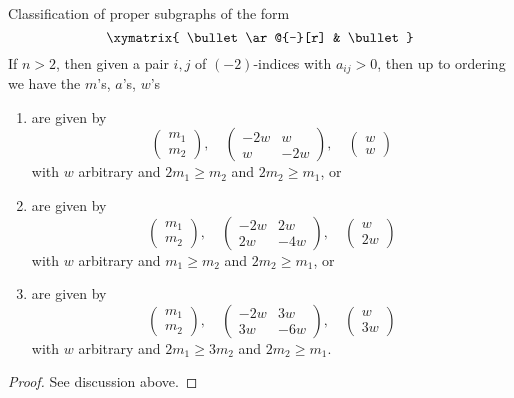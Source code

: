 \begin{lemma}
\label{lemma-two-by-two}
Classification of proper subgraphs of the form
$$
\xymatrix{
\bullet \ar@{-}[r] & \bullet
}
$$
If $n > 2$, then given a pair $i, j$ of $(-2)$-indices with $a_{ij} > 0$,
then up to ordering we have the $m$'s, $a$'s, $w$'s
\begin{enumerate}
\item
\label{item-A2}
are given by
$$
\left(
\begin{matrix}
m_1 \\
m_2
\end{matrix}
\right),
\quad
\left(
\begin{matrix}
-2w & w \\
w & -2w
\end{matrix}
\right),
\quad
\left(
\begin{matrix}
w \\
w
\end{matrix}
\right)
$$
with $w$ arbitrary and $2m_1 \geq m_2$ and $2m_2 \geq m_1$, or
\item
\label{item-B2}
are given by
$$
\left(
\begin{matrix}
m_1 \\
m_2
\end{matrix}
\right),
\quad
\left(
\begin{matrix}
-2w & 2w \\
2w & -4w
\end{matrix}
\right),
\quad
\left(
\begin{matrix}
w \\
2w
\end{matrix}
\right)
$$
with $w$ arbitrary and $m_1 \geq m_2$ and $2m_2 \geq m_1$, or
\item
\label{item-G2}
are given by
$$
\left(
\begin{matrix}
m_1 \\
m_2
\end{matrix}
\right),
\quad
\left(
\begin{matrix}
-2w & 3w \\
3w & -6w
\end{matrix}
\right),
\quad
\left(
\begin{matrix}
w \\
3w
\end{matrix}
\right)
$$
with $w$ arbitrary and $2m_1 \geq 3m_2$ and $2m_2 \geq m_1$.
\end{enumerate}
\end{lemma}

\begin{proof}
See discussion above.
\end{proof}

